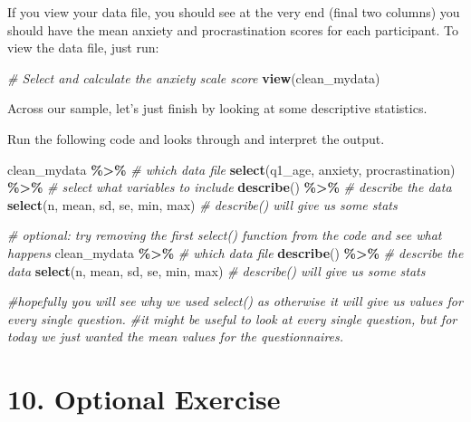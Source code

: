 \documentclass[
]{book}
\newenvironment{Shaded}{\begin{snugshade}}{\end{snugshade}}
\newcommand{\CommentTok}[1]{\textcolor[rgb]{0.56,0.35,0.01}{\textit{#1}}}
\newcommand{\FunctionTok}[1]{\textcolor[rgb]{0.13,0.29,0.53}{\textbf{#1}}}
\newcommand{\NormalTok}[1]{#1}
\newcommand{\SpecialCharTok}[1]{\textcolor[rgb]{0.81,0.36,0.00}{\textbf{#1}}}
\let\oldsection\section
\renewcommand{\section}{\needspace{5\baselineskip}\oldsection}
\begin{document}
If you view your data file, you should see at the very end (final two columns) you should have the mean anxiety and procrastination scores for each participant.
To view the data file, just run:

\begin{Shaded}
\begin{Highlighting}[]
\CommentTok{\# Select and calculate the anxiety scale score}
\FunctionTok{view}\NormalTok{(clean\_mydata)}
\end{Highlighting}
\end{Shaded}

Across our sample, let's just finish by looking at some descriptive statistics.

Run the following code and looks through and interpret the output.

\begin{Shaded}
\begin{Highlighting}[]
\NormalTok{clean\_mydata }\SpecialCharTok{\%\textgreater{}\%}                                     \CommentTok{\# which data file }
  \FunctionTok{select}\NormalTok{(q1\_age, anxiety, procrastination) }\SpecialCharTok{\%\textgreater{}\%}       \CommentTok{\# select what variables to include}
  \FunctionTok{describe}\NormalTok{() }\SpecialCharTok{\%\textgreater{}\%}                                     \CommentTok{\# describe the data}
  \FunctionTok{select}\NormalTok{(n, mean, sd, se, min, max)                  }\CommentTok{\# describe() will give us some stats}

\CommentTok{\# optional: try removing the first select() function from the code and see what happens}
\NormalTok{clean\_mydata }\SpecialCharTok{\%\textgreater{}\%}                                     \CommentTok{\# which data file }
  \FunctionTok{describe}\NormalTok{() }\SpecialCharTok{\%\textgreater{}\%}                                     \CommentTok{\# describe the data}
  \FunctionTok{select}\NormalTok{(n, mean, sd, se, min, max)                  }\CommentTok{\# describe() will give us some stats}

\CommentTok{\#hopefully you will see why we used select() as otherwise it will give us values for every single question.}
\CommentTok{\#it might be useful to look at every single question, but for today we just wanted the mean values for the questionnaires.}
\end{Highlighting}
\end{Shaded}

\section{\texorpdfstring{\textbf{10. Optional Exercise}}{10. Optional Exercise}}\label{optional-exercise}
\end{document}
